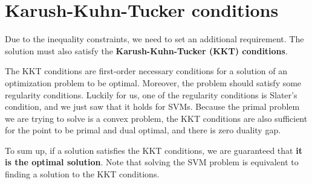 \section{Karush-Kuhn-Tucker conditions }
Due to the inequality constraints, we need to set an additional requirement. The solution must also satisfy the \textbf{Karush-Kuhn-Tucker (KKT) conditions}. 

The KKT conditions are first-order necessary conditions for a solution of an optimization problem to be optimal. Moreover, the problem should satisfy some regularity conditions. Luckily for us, one of the regularity conditions is Slater’s condition, and we just saw that it holds for SVMs. Because the primal problem we are trying to solve is a convex problem, the KKT conditions are also sufficient for the point to be primal and dual optimal, and there is zero duality gap. 

To sum up, if a solution satisfies the KKT conditions, we are guaranteed that \textbf{it is the optimal solution}. Note that solving the SVM problem is equivalent to finding a solution to the KKT conditions. 



